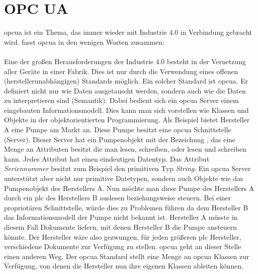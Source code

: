 \section{OPC UA}
\ac{opcua} ist ein Thema, das immer wieder mit Industrie 4.0 in Verbindung gebracht wird.
\citet{opcua:2018} fasst \acs{opcua} in den wenigen  Worten zusammen:\\
\\
Eine der großen Herausforderungen der Industrie 4.0 besteht in der Vernetzung aller Geräte in einer Fabrik.
Dies ist nur durch die Verwendung eines offenen (herstellerunabhängigen) Standards möglich.
Ein solcher Standard ist \ac{opcua}. 
Er definiert nicht nur wie Daten ausgetauscht werden, 
sondern auch wie die Daten zu interpretieren sind (Semantik).
Dabei bedient sich ein \ac{opcua} Server einem eingebauten Informationsmodell. 
Dies kann man sich vorstellen wie Klassen und Objekte in der objektorientierten Programmierung.
Als Beispiel bietet Hersteller A eine Pumpe am Markt an. 
Diese Pumpe besitzt eine \ac{opcua} Schnittstelle (Server).
Dieser Server hat ein Pumpenobjekt mit der Bezeichung , das eine Menge an Attributen besitzt die man lesen, schreiben, oder lesen und schreiben kann.
Jedes Attribut hat einen eindeutigen Datentyp. 
Das Attribut \emph{Seriennummer} besitzt zum Beispiel den primitiven Typ \emph{String}.
Ein \ac{opcua} Server unterstützt aber nicht nur primitive Datetypen, 
sondern auch Objekte wie das Pumpenobjekt  des Herstellers A.
Nun möchte man diese Pumpe des Herstellers A durch ein \ac{plc} des Herstellers B auslesen beziehungsweise steuern.
Bei einer propriotären Schnittstelle, würde dies zu Problemen führen da dem Hersteller B das Informationsmodell der Pumpe nicht bekannt ist. 
Hersteller A müsste in diesem Fall Dokumente liefern, mit denen Hersteller B die Pumpe ansteuern könnte.
Der Hersteller wäre also gezwungen, für jeden größeren \ac{plc} Hersteller, verschiedene Dokumente zur Verfügung zu stellen.
\ac{opcua} geht an dieser Stelle einen anderen Weg. 
Der \ac{opcua} Standard stellt eine Menge an \ac{opcua} Klassen zur Verfügung, 
von denen die Hersteller nun ihre eigenen Klassen ableiten können.
